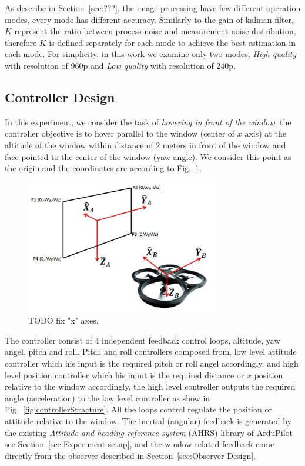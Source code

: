 \documentclass{sig-alternate-ipsn13}
\begin{document}
As describe in Section~\ref{sec:???}, the image processing have few different operation modes, every mode has different accuracy.
Similarly to the gain of kalman filter, $K$ represent the ratio between process noise and measurement noise distribution, therefore $K$ is defined separately for each mode to achieve the best estimation in each mode.
For simplicity, in this work we examine only two modes, \textit{High quality} with resolution of 960p and \textit{Low quality} with resolution of 240p.

\subsection{Controller Design}

In this experiment, we consider the task of \textit{hovering in front of the window}, the controller objective is to hover parallel to the window (center of $x$ axis) at the altitude of the window within distance of 2 meters in front of the window and face pointed to the center of the window (yaw angle).
We consider this point as the origin and the coordinates are according to Fig.~\ref{fig:axis}.

\begin{figure}[htbp]
    \centerline{\includegraphics[width=85mm]{axes_fron_hanoch.jpg}}
    \caption{TODO fix "x" axes.}
    \label{fig:axis}
\end{figure}

The controller consist of 4 independent feedback control loops, altitude, yaw angel, pitch and roll.
Pitch and roll controllers composed from, low level attitude controller which his input is the required pitch or roll angel accordingly, and high level position controller which his input is the required distance or $x$ position relative to the window accordingly, the high level controller outputs the required angle (acceleration) to the low level controller as show in Fig.~\ref{fig:controllerStracture}.
All the loops control regulate the position or attitude relative to the window.
The inertial (angular) feedback is generated by the existing \textit{Attitude and heading reference system} (AHRS) library of ArduPilot see Section~\ref{sec:Experiment setup}, and the window related feedback come directly from the observer described in Section~\ref{sec:Observer Design}.
\end{document}
